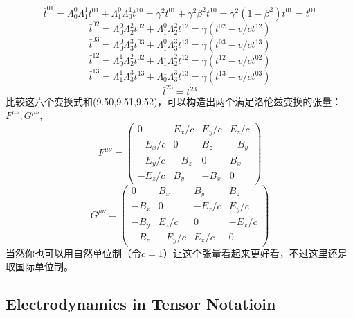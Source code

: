 \documentclass[14pt,oneside]{book}
\begin{document}
\begin{large}
\begin{equation}
  \bar t^{01}=\Lambda_0^0\Lambda_1^1t^{01}+\Lambda_1^0\Lambda_0^1t^{10}=\gamma^2t^{01}+\gamma^2\beta^2t^{10}=\gamma^2(1-\beta^2)t^{01}=t^{01}
\end{equation}
\begin{equation}
  \bar t^{02}=\Lambda_0^0\Lambda^2_2t^{02}+\Lambda_1^0\Lambda_2^2t^{12}=\gamma (t^{02}-v/c t^{12})
\end{equation}
\begin{equation}
  \bar t^{03}=\Lambda_0^0\Lambda^3_3t^{03}+\Lambda_1^0\Lambda_3^3t^{13}=\gamma (t^{03}-v/c t^{13})
\end{equation}
\begin{equation}
  \bar t^{12}=\Lambda_0^1\Lambda^2_2t^{02}+\Lambda_1^1\Lambda_2^2t^{12}=\gamma(t^{12}-v/c t^{02})
\end{equation}
\begin{equation}
  \bar t^{13}=\Lambda_1^1\Lambda^3_3t^{13}+\Lambda_0^1\Lambda_3^3t^{13}=\gamma (t^{13}-v/c t^{03})
\end{equation}
\begin{equation}
  \bar t^{23}=t^{23}
\end{equation}
比较这六个变换式和(9.50,9.51,9.52)，可以构造出两个满足洛伦兹变换的张量：$F^{\mu\nu},G^{\mu\nu}$,
\begin{equation}
F^{\mu \nu}=\left(\begin{array}{cccc}
0 & E_x / c & E_y / c & E_z / c \\
-E_x / c & 0 & B_z & -B_y \\
-E_y / c & -B_z & 0 & B_x \\
-E_z / c & B_y & -B_x & 0
\end{array}\right)
\end{equation}
\begin{equation}
G^{\mu \nu}=\left(\begin{array}{cccc}
0 & B_x & B_y & B_z \\
-B_x & 0 & -E_z / c & E_y / c \\
-B_y & E_z / c & 0 & -E_x / c \\
-B_z & -E_y / c & E_x / c & 0
\end{array}\right)
\end{equation}
当然你也可以用自然单位制（令$c=1$）让这个张量看起来更好看，不过这里还是取国际单位制。

\subsection{Electrodynamics in Tensor Notatioin}

\end{large}
\end{document}
